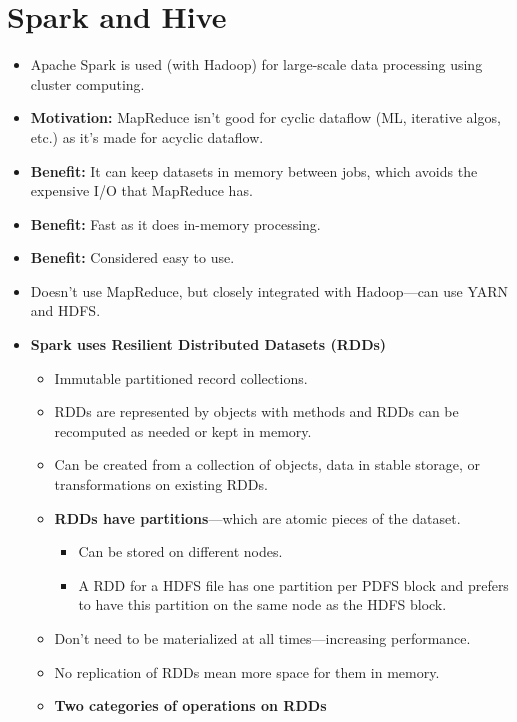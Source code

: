 
\section{Spark and Hive}
\begin{multicols}{2}
\begin{itemize}
\item
  Apache Spark is used (with Hadoop) for large-scale data processing
  using cluster computing.
\item \textbf{Motivation:} MapReduce isn't good for cyclic dataflow (ML, iterative algos, etc.) as it's made for acyclic dataflow.
\item
  \textbf{Benefit:} It can keep datasets in memory between jobs, which
  avoids the expensive I/O that MapReduce has.
\item
  \textbf{Benefit:} Fast as it does in-memory processing.
\item
  \textbf{Benefit:} Considered easy to use.
\item
  Doesn't use MapReduce, but closely integrated with Hadoop---can use
  YARN and HDFS.
\item
  \textbf{Spark uses Resilient Distributed Datasets (RDDs)}

  \begin{itemize}
    \item
    Immutable partitioned record collections.
  \item
    RDDs are represented by objects with methods and RDDs can be
    recomputed as needed or kept in memory.
  \item
    Can be created from a collection of objects, data in stable storage,
    or transformations on existing RDDs.
  \item
    \textbf{RDDs have partitions}---which are atomic pieces of the
    dataset.

    \begin{itemize}
        \item
      Can be stored on different nodes.
    \item
      A RDD for a HDFS file has one partition per PDFS block and prefers
      to have this partition on the same node as the HDFS block.
    \end{itemize}
  \item
    Don't need to be materialized at all times---increasing performance.
  \item
    No replication of RDDs mean more space for them in memory.
  \item
    \textbf{Two categories of operations on RDDs}


\end{itemize}
\end{itemize}
\end{multicols}
